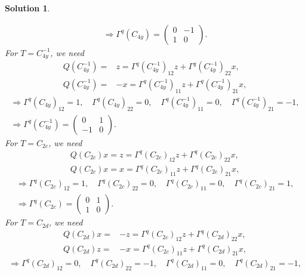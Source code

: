 \documentclass[UTF8,10pt,a4paper]{article}
\theoremstyle{Problem}
\theoremstyle{Solution}
\newtheorem*{sol}{Solution}
\begin{document}
\begin{sol}
\begin{enumerate}
\begin{gather}
            \Longrightarrow\Gamma^q(C_{4y})=\left(\begin{matrix}
                0&-1\\
                1&0
            \end{matrix}\right).
        \end{gather}
        For $T=C_{4y}^{-1}$, we need
        \begin{align}
            Q(C_{4y}^{-1})=&z=\Gamma^q(C_{4y}^{-1})_{12}z+\Gamma^q(C_{4y}^{-1})_{22}x,\\
            Q(C_{4y}^{-1})=&-x=\Gamma^q(C_{4y}^{-1})_{11}z+\Gamma^q(C_{4y}^{-1})_{21}x,
        \end{align}
        \begin{gather}
            \Longrightarrow\Gamma^q(C_{4y})_{12}=1,\quad\Gamma^q(C_{4y})_{22}=0,\quad\Gamma^q(C_{4y}^{-1})_{11}=0,\quad\Gamma^q(C_{4y}^{-1})_{21}=-1,\\
            \Longrightarrow\Gamma^q(C_{4y}^{-1})=\left(\begin{matrix}
                0&1\\
                -1&0
            \end{matrix}\right).
        \end{gather}
        For $T=C_{2c}$, we need
        \begin{align}
            Q(C_{2c})x=z=\Gamma^q(C_{2c})_{12}z+\Gamma^q(C_{2c})_{22}x,\\
            Q(C_{2c})x=x=\Gamma^q(C_{2c})_{11}z+\Gamma^q(C_{2c})_{21}x,
        \end{align}
        \begin{gather}
            \Longrightarrow\Gamma^q(C_{2c})_{12}=1,\quad\Gamma^q(C_{2c})_{22}=0,\quad\Gamma^q(C_{2c})_{11}=0,\quad\Gamma^q(C_{2c})_{21}=1,\\
            \Longrightarrow\Gamma^q(C_{2c})=\left(\begin{matrix}
                0&1\\
                1&0
            \end{matrix}\right).
        \end{gather}
        For $T=C_{2d}$, we need
        \begin{align}
            Q(C_{2d})x=&-z=\Gamma^q(C_{2c})_{12}z+\Gamma^q(C_{2d})_{22}x,\\
            Q(C_{2d})z=&-x=\Gamma^q(C_{2c})_{11}z+\Gamma^q(C_{2d})_{21}x,
        \end{align}
        \begin{gather}
            \Longrightarrow\Gamma^q(C_{2d})_{12}=0,\quad\Gamma^q(C_{2d})_{22}=-1,\quad\Gamma^q(C_{2d})_{11}=0,\quad\Gamma^q(C_{2d})_{21}=-1,\\

\end{gather}
\end{enumerate}
\end{sol}
\end{document}

